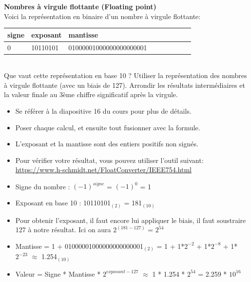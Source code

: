 \begin{Exercice}[10 minutes] \textbf{Nombres à virgule flottante (Floating point)}\\
    
    Voici la représentation en binaire d'un nombre à virgule flottante: \\
    
     \begin{tabular}{| p{1cm} | p{3cm} | p{9.5cm} | p{1cm} | p{1cm} | p{1cm} | p{1cm} | p{1cm} | p{1cm} |} 
            \hline
            signe & exposant & mantisse \\ [0.5ex] 
            \hline
            0 & 10110101 & 01000001000000000000001 \\ [0.5ex]
            \hline
	\end{tabular}
	\\
    
    Que vaut cette représentation en base 10 ? Utiliser la représentation des nombres à virgule flottante (avec un biais de 127). Arrondir les résultats intermédiaires et la valeur finale au 3ème chiffre significatif après la virgule. \\
	
    \begin{conseil}
    
    \begin{itemize}
    	\item Se référer à la diapositive 16 du cours pour plus de détails.
    	\item Poser chaque calcul, et ensuite tout fusionner avec la formule.
    	\item L'exposant et la mantisse sont des entiers positifs non signés.
    	\item Pour vérifier votre résultat, vous pouvez utiliser l'outil suivant: \url{https://www.h-schmidt.net/FloatConverter/IEEE754.html}
    \end{itemize}
    
    \end{conseil}
    
    \begin{solution}
        \begin{itemize}
        	\item Signe du nombre : $(-1)^{signe}$ = $(-1)^0$ = 1
        	\item Exposant en base 10 : 10110101$_{(2)}$ = 181$_{(10)}$
        	\item Pour obtenir l'exposant, il faut encore lui appliquer le biais, il faut soustraire 127 à notre résultat. Ici on aura $2^{(181-127)}$ = $2^{54}$
        	\item Mantisse = 1 + 01000001000000000000001$_{(2)}$ = 1 + 1*$2^{-2}$ + 1*$2^{-8}$ + 1*$2^{-23}$ $\approx$ 1.254$_{(10)}$
        	\item Valeur = Signe * Mantisse * $2^{exposant-127}$ $\approx$ 1 * 1.254 * $2^{54}$ = 2.259 * $10^{16}$
        \end{itemize}
    \end{solution}
\end{Exercice}


